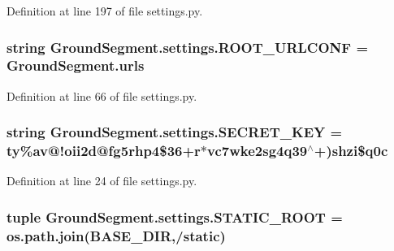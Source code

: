 Definition at line 197 of file settings.\+py.

\hypertarget{namespace_ground_segment_1_1settings_af881d9abde1eaf859b6067764a32059a}{}
\subsubsection[{R\+O\+O\+T\+\_\+\+U\+R\+L\+C\+O\+N\+F}]{\setlength{\rightskip}{0pt plus 5cm}string Ground\+Segment.\+settings.\+R\+O\+O\+T\+\_\+\+U\+R\+L\+C\+O\+N\+F = \textquotesingle{}Ground\+Segment.\+urls\textquotesingle{}}\label{namespace_ground_segment_1_1settings_af881d9abde1eaf859b6067764a32059a}


Definition at line 66 of file settings.\+py.

\hypertarget{namespace_ground_segment_1_1settings_a962d63c2c779045196141e0ac3e0415a}{}
\subsubsection[{S\+E\+C\+R\+E\+T\+\_\+\+K\+E\+Y}]{\setlength{\rightskip}{0pt plus 5cm}string Ground\+Segment.\+settings.\+S\+E\+C\+R\+E\+T\+\_\+\+K\+E\+Y = \textquotesingle{}ty\%av@!oii2d@fg5rhp4\$36+r$\ast$vc7wke2sg4q39$^\wedge$+)shzi\$q0c\textquotesingle{}}\label{namespace_ground_segment_1_1settings_a962d63c2c779045196141e0ac3e0415a}


Definition at line 24 of file settings.\+py.

\hypertarget{namespace_ground_segment_1_1settings_a99341177ff9700bce98aaa850c09412d}{}
\subsubsection[{S\+T\+A\+T\+I\+C\+\_\+\+R\+O\+O\+T}]{\setlength{\rightskip}{0pt plus 5cm}tuple Ground\+Segment.\+settings.\+S\+T\+A\+T\+I\+C\+\_\+\+R\+O\+O\+T = os.\+path.\+join({\bf B\+A\+S\+E\+\_\+\+D\+I\+R},\textquotesingle{}/static\textquotesingle{})}\label{namespace_ground_segment_1_1settings_a99341177ff9700bce98aaa850c09412d}


